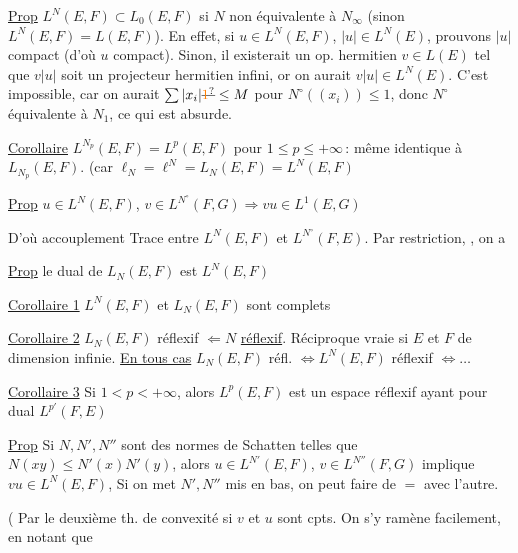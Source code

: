
\uline{Prop} $L^N(E,F)\subset L_0(E,F)$ si $N$ non équivalente à $N_\infty$\unsure{;} (sinon $L^N(E,F)=L(E,F)$). En effet, si $u\in L^N(E,F)$,  $|u|\in L^N(E)$, prouvons $|u|$ compact (d'où $u$ compact). Sinon, il existerait un op. hermitien $v\in L(E)$ tel que $v|u|$ soit un projecteur hermitien infini, or on aurait $v|u|\in L^N(E)$. C'est impossible, car on  aurait $\sum|x_i|\deleted{\unsure{1}}\leq M$ pour $N^\circ((x_i))\leq 1$, donc $N^\circ$ équivalente à $N_1$, ce qui est absurde.

\uline{Corollaire} $L^{N_p}(E,F)=L^p(E,F)$ pour $1\leq p\leq+\infty$\,:  même identique à $L_{N_p}(E,F)$. (car $\ell_N=\ell^N=L_N(E,F)=L^N(E,F)$\unsure{)}

\uline{Prop} $u\in L^N(E,F)$, $v\in L^{N^\circ}(F,G)\Rightarrow vu\in L^1(E,G)$

D'où accouplement Trace entre $L^N(E,F)$ et $L^{N^\circ}(F,E)$. Par restriction,  , on a

\uline{Prop} le dual de $L_N(E,F)$ est $L^N(E,F)$

\uline{Corollaire 1} $L^N(E,F)$ et $L_N(E,F)$ sont complets

\uline{Corollaire 2} $L_N(E,F)$ réflexif $\Leftarrow N$ \uline{réflexif}. Réciproque vraie si $E$ et $F$ de dimension infinie. \uline{En tous cas} $L_N(E,F)$ réfl. $\Longleftrightarrow L^N(E,F)$ réflexif $\Longleftrightarrow\ldots$

\uline{Corollaire 3} Si $1<p<+\infty$, alors $L^p(E,F)$ est un espace réflexif ayant pour dual $L^{p'}(F,E)$

\uline{Prop} Si $N,N',N''$ sont des normes de Schatten telles que $N(xy)\leq N'(x)N'(y)$, alors $u\in L^{N'}(E,F)$, $v\in L^{N''}(F,G)$ implique $vu\in L^N(E,F)$,  Si on met  $N',N''$  mis en bas, on peut faire de $=$ avec l'autre.

(  Par le deuxième th. de convexité si $v$ et $u$ sont   cpts. On s'y ramène facilement, en notant que 

